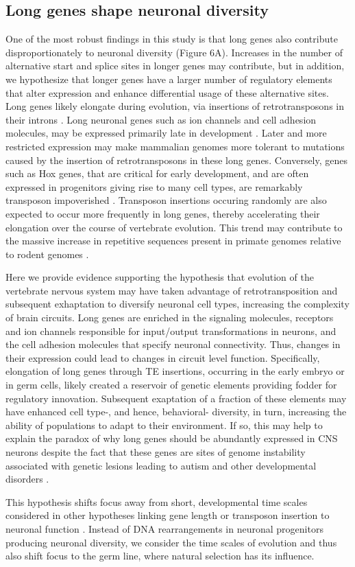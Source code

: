 \subsection{Long genes shape neuronal diversity}
One of the most robust findings in this study is that long genes also contribute disproportionately to neuronal diversity (Figure 6A). Increases in the number of alternative start and splice sites in longer genes may contribute, but in addition, we hypothesize that longer genes have a larger number of regulatory elements that alter expression and enhance differential usage of these alternative sites. Long genes likely elongate during evolution, via insertions of retrotransposons in their introns \cite{Sela_2007,Grishkevich_2014}. Long neuronal genes such as ion channels and cell adhesion molecules, may be expressed primarily late in development \cite{Okaty_2009}. Later and more restricted expression may make mammalian genomes more tolerant to mutations caused by the insertion of retrotransposons in these long genes. Conversely, genes such as Hox genes, that are critical for early development, and are often expressed in progenitors giving rise to many cell types, are remarkably transposon impoverished \cite{Chinwalla_2002,Simons_2005}. Transposon insertions occuring randomly are also expected to occur more frequently in long genes, thereby accelerating their elongation over the course of vertebrate evolution. This trend may contribute to the massive increase in repetitive sequences present in primate genomes relative to rodent genomes \cite{Chuong_2016}. 

Here we provide evidence supporting the hypothesis that evolution of the vertebrate nervous system may have taken advantage of retrotransposition and subsequent exhaptation to diversify neuronal cell types, increasing the complexity of brain circuits. Long genes are enriched in the signaling molecules, receptors and ion channels responsible for input/output transformations in neurons, and the cell adhesion molecules that specify neuronal connectivity. Thus, changes in their expression could lead to changes in circuit level function. Specifically, elongation of long genes through TE insertions, occurring in the early embryo or in germ cells, likely created a reservoir of genetic elements providing fodder for regulatory innovation. Subsequent exaptation of a fraction of these elements may have enhanced cell type-, and hence, behavioral- diversity, in turn, increasing the ability of populations to adapt to their environment. If so, this may help to explain the paradox of why long genes should be abundantly expressed in CNS neurons despite the fact that these genes are sites of genome instability associated with genetic lesions leading to autism and other developmental disorders \cite{Wei_2016}. 

This hypothesis shifts focus away from short, developmental time scales considered in other hypotheses linking gene length or transposon insertion to neuronal function \cite{Muotri_2005}\cite{Richardson_2014}\cite{Perrat_2013}. Instead of DNA rearrangements in neuronal progenitors producing neuronal diversity, we consider the time scales of evolution and thus also shift focus to the germ line, where natural selection has its influence. 

